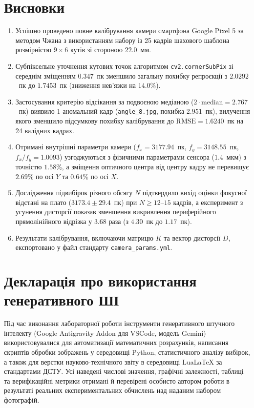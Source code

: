 \documentclass[14pt, a4paper]{extarticle}
\begin{document}
\section{Висновки}
\begin{enumerate}
    \item Успішно проведено повне калібрування камери смартфона Google Pixel 5 за методом Чжана з використанням набору із 25 кадрів шахового шаблона розмірністю $9 \times 6$ кутів зі стороною $22.0$~мм.
    \item Субпіксельне уточнення кутових точок алгоритмом \texttt{cv2.cornerSubPix} зі середнім зміщенням $0.347$~пк зменшило загальну похибку репроєкції з $2.0292$~пк до $1.7453$~пк (зниження нев'язки на $14.0\%$).
    \item Застосування критерію відсікання за подвоєною медіаною ($2 \cdot \text{median} = 2.767$~пк) виявило 1 аномальний кадр (\texttt{angle\_8.jpg}, похибка $2.951$~пк), вилучення якого зменшило підсумкову похибку калібрування до $\text{RMSE} = 1.6240$~пк на 24 валідних кадрах.
    \item Отримані внутрішні параметри камери ($f_x = 3177.94$~пк, $f_y = 3148.55$~пк, $f_x/f_y = 1.0093$) узгоджуються з фізичними параметрами сенсора ($1.4$~мкм) з точністю $1.58\%$, а зміщення оптичного центра від центру кадру не перевищує $2.69\%$ по осі $Y$ та $0.64\%$ по осі $X$.
    \item Дослідження підвибірок різного обсягу $N$ підтвердило вихід оцінки фокусної відстані на плато ($3173.4 \pm 29.4$~пк) при $N \ge 12$--$15$ кадрів, а експеримент з усунення дисторсії показав зменшення викривлення периферійного прямолінійного відрізка у $3.68$ раза (з $4.30$~пк до $1.17$~пк).
    \item Результати калібрування, включаючи матрицю $K$ та вектор дисторсії $D$, експортовано у файл стандарту \texttt{camera\_params.yml}.
\end{enumerate}

\section{Декларація про використання генеративного ШІ}
Під час виконання лабораторної роботи інструменти генеративного штучного інтелекту (Google Antigravity Addon для VSCode, модель Gemini) використовувалися для автоматизації математичних розрахунків, написання скриптів обробки зображень у середовищі Python, статистичного аналізу вибірок, а також для верстки науково-технічного звіту в середовищі LuaLaTeX за стандартами ДСТУ. Усі наведені числові значення, графічні залежності, таблиці та верифікаційні метрики отримані й перевірені особисто автором роботи в результаті реальних експериментальних обчислень над наданим набором фотографій.
\end{document}
